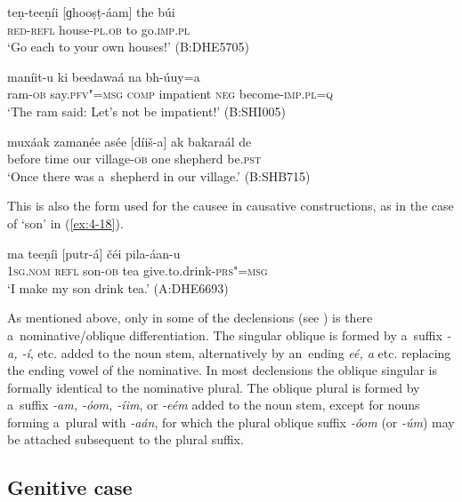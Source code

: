 \begin{exe}
\ex
\label{ex:4-15}
\gll teṇ-teeṇíi [ɡhooṣṭ-áam] the búi\\
	\textsc{red}-\textsc{refl} house-\textsc{pl.ob} to go.\textsc{imp.pl} \\
\glt `Go each to your own houses!' (B:DHE5705)
\end{exe}

\begin{exe}
\ex
\label{ex:4-16}
\gll [míḍ-a] maníit-u ki beedawaá na bh-úuy=a \\
	ram-\textsc{ob} say.\textsc{pfv"=msg} \textsc{comp} impatient \textsc{neg} become-\textsc{imp.pl=q} \\
\glt `The ram said: Let's not be impatient!' (B:SHI005)
\end{exe}

\begin{exe}
\ex
\label{ex:4-17}
\gll muxáak zamanée asée [díiš-a] ak bakaraál de \\
	before time our village-\textsc{ob} one shepherd be.\textsc{pst} \\
\glt `Once there was a~shepherd in our village.' (B:SHB715)
\end{exe}

This is also the form used for the causee in causative constructions, as in the case of `son' in (\ref{ex:4-18}). 


\begin{exe}
\ex
\label{ex:4-18}
\gll ma teeṇíi [putr-á] čéi pila-áan-u \\
	\textsc{1sg.nom} \textsc{refl} son-\textsc{ob} tea give.to.drink-\textsc{prs"=msg} \\
\glt `I make my son drink tea.' (A:DHE6693)
\end{exe}

As mentioned above, only in some of the declensions (see ) is there a~nominative/oblique differentiation. The singular oblique is formed by a~suffix \textit{-a, -í}, etc. added to the noun stem, alternatively by an~ending \textit{eé, a} etc. replacing the ending vowel of the nominative. In most declensions the oblique singular is formally identical to the nominative plural. The oblique plural is formed by a~suffix \textit{-am, -óom, -íim}, or \textit{-eém} added to the noun stem, except for nouns forming a~plural with \textit{-aán}, for which the plural oblique suffix \textit{-óom} (or \textit{-úm}) may be attached subsequent to the plural suffix.

\subsection{Genitive case}
\label{subsec:4-5-3}

